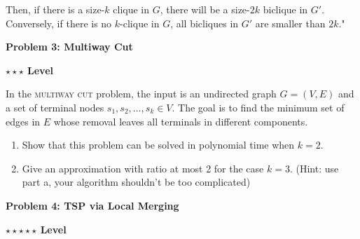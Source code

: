 \documentclass{article}\usepackage[utf8]{inputenc}\usepackage[margin=0.4cm,top=0.4cm,bottom=0.4cm]{geometry}\usepackage[usenames,dvipsnames,svgnames,table]{xcolor}
\begin{document}
\begin{enumerate}[a.]
\begin{addmargin}[0.75cm]{0cm}
Then, if there is a size-$k$ clique in $G$, there will be a size-$2k$ biclique in $G'$. Conversely, if there is no $k$-clique in $G$, all bicliques in $G'$ are smaller than $2k$."
\end{addmargin}
\BeginSolution %

\EndSolution
\end{enumerate}
\clearpage

\vspace{-2mm}\noindent\begin{mybox}{\begin{center}\textbf{\color{black}Problem 3: Multiway Cut}\end{center}}\end{mybox}\vspace{-2mm}
\begin{myboxot}\noindent\textbf{$\star\star\star$ Level}\end{myboxot} 

\noindent In the \textsc{multiway cut} problem, the input is an undirected graph $G = (V,E)$ and a set of terminal nodes $s_1,s_2,\ldots,s_k \in V$. The goal is to find the minimum set of edges in $E$ whose removal leaves all terminals in different components.

\begin{enumerate}
\item Show that this problem can be solved in polynomial time when $k = 2$.
\BeginSolution %
\EndSolution

\item Give an approximation with ratio at most 2 for the case $k = 3$. (Hint: use part a, your algorithm
shouldn't be too complicated)
\BeginSolution %
\EndSolution
\end{enumerate}
\clearpage

\vspace{-2mm}\noindent\begin{mybox}{\begin{center}\textbf{\color{black}Problem 4: TSP via Local Merging}\end{center}}\end{mybox}\vspace{-2mm}
\begin{myboxot}\noindent\textbf{$\star\star\star\star\star$ Level}\end{myboxot} 
\end{document}
